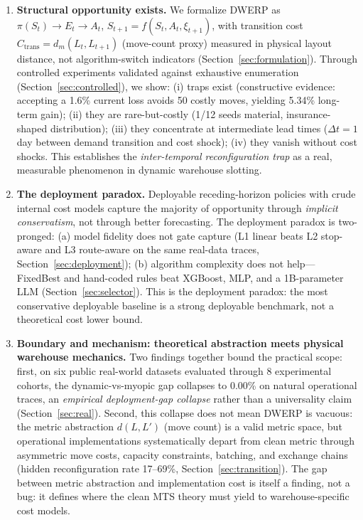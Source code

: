 \documentclass[11pt,a4paper]{article}
\begin{document}
\begin{enumerate}
\item \textbf{Structural opportunity exists.} We formalize DWERP as
$\pi(S_t) \to E_t \to A_t$, $S_{t+1} = f(S_t, A_t, \xi_{t+1})$, with
transition cost $C_{\text{trans}} = d_m(L_t, L_{t+1})$ (move-count proxy) measured in physical
layout distance, not algorithm-switch indicators
(Section~\ref{sec:formulation}). Through controlled experiments
validated against exhaustive enumeration (Section~\ref{sec:controlled}),
we show: (i) traps exist (constructive evidence: accepting a 1.6\% current
loss avoids 50 costly moves, yielding 5.34\% long-term gain);
(ii) they are rare-but-costly (1/12 seeds material, insurance-shaped
distribution); (iii) they concentrate at intermediate lead times
($\Delta t = 1$ day between demand transition and cost shock);
(iv) they vanish without cost shocks. This establishes the
\emph{inter-temporal reconfiguration trap} as a real, measurable
phenomenon in dynamic warehouse slotting.

\item \textbf{The deployment paradox.} Deployable receding-horizon
policies with crude internal cost models capture the majority of
opportunity through \emph{implicit conservatism}, not through better
forecasting. The deployment paradox is two-pronged: (a) model fidelity
does not gate capture (L1 linear beats L2 stop-aware and L3 route-aware
on the same real-data traces, Section~\ref{sec:deployment}); (b) algorithm
complexity does not help---FixedBest and hand-coded rules beat
XGBoost, MLP, and a 1B-parameter LLM (Section~\ref{sec:selector}).
This is the deployment paradox: the most conservative deployable baseline
is a strong deployable benchmark, not a theoretical cost lower bound.

\item \textbf{Boundary and mechanism: theoretical abstraction
meets physical warehouse mechanics.} Two findings together bound the
practical scope: first, on six public real-world datasets evaluated
through 8 experimental cohorts, the dynamic-vs-myopic gap collapses to
0.00\% on natural operational traces, an \emph{empirical deployment-gap
collapse} rather than a universality claim (Section~\ref{sec:real}).
Second, this collapse does not mean DWERP is vacuous: the metric
abstraction $d(L,L')$ (move count) is a valid metric space, but
operational implementations systematically depart from clean metric
through asymmetric move costs, capacity constraints, batching, and
exchange chains (hidden reconfiguration rate 17--69\%,
Section~\ref{sec:transition}). The gap between metric abstraction and
implementation cost is itself a finding, not a bug: it defines where
the clean MTS theory must yield to warehouse-specific cost models.
\end{enumerate}
\end{document}

